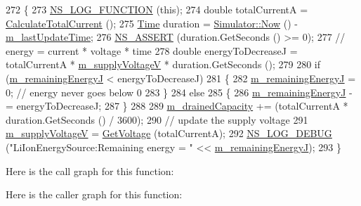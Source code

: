 \begin{DoxyCode}
272 \{
273   \hyperlink{log-macros-disabled_8h_a90b90d5bad1f39cb1b64923ea94c0761}{NS\_LOG\_FUNCTION} (\textcolor{keyword}{this});
274   \textcolor{keywordtype}{double} totalCurrentA = \hyperlink{classns3_1_1EnergySource_ac8b121ba1389d5545705e52d1a6fd602}{CalculateTotalCurrent} ();
275   \hyperlink{namespacens3_1_1TracedValueCallback_a7ffd3e7c142ffe7c8a1d2db9b8de38ec}{Time} duration = \hyperlink{classns3_1_1Simulator_ac3178fa975b419f7875e7105be122800}{Simulator::Now} () - \hyperlink{classns3_1_1LiIonEnergySource_aff305a21b56ec669a64b5e0fa5d8d268}{m\_lastUpdateTime};
276   \hyperlink{assert_8h_a6dccdb0de9b252f60088ce281c49d052}{NS\_ASSERT} (duration.GetSeconds () >= 0);
277   \textcolor{comment}{// energy = current * voltage * time}
278   \textcolor{keywordtype}{double} energyToDecreaseJ = totalCurrentA * \hyperlink{classns3_1_1LiIonEnergySource_a52a95a68d5ee4c420a207d00c2905eb2}{m\_supplyVoltageV} * duration.GetSeconds ();
279 
280   \textcolor{keywordflow}{if} (\hyperlink{classns3_1_1LiIonEnergySource_a550b7c1858cc4a397290c5696eff4e3e}{m\_remainingEnergyJ} < energyToDecreaseJ) 
281     \{
282       \hyperlink{classns3_1_1LiIonEnergySource_a550b7c1858cc4a397290c5696eff4e3e}{m\_remainingEnergyJ} = 0; \textcolor{comment}{// energy never goes below 0}
283     \} 
284   \textcolor{keywordflow}{else} 
285     \{
286       \hyperlink{classns3_1_1LiIonEnergySource_a550b7c1858cc4a397290c5696eff4e3e}{m\_remainingEnergyJ} -= energyToDecreaseJ;
287     \}  
288 
289   \hyperlink{classns3_1_1LiIonEnergySource_a185b1e4fc53512a50a8d3c4400877f2c}{m\_drainedCapacity} += (totalCurrentA * duration.GetSeconds () / 3600);
290   \textcolor{comment}{// update the supply voltage}
291   \hyperlink{classns3_1_1LiIonEnergySource_a52a95a68d5ee4c420a207d00c2905eb2}{m\_supplyVoltageV} = \hyperlink{classns3_1_1LiIonEnergySource_ab27fe1a4814c0c1a4d67936c6c2b141f}{GetVoltage} (totalCurrentA);
292   \hyperlink{group__logging_ga413f1886406d49f59a6a0a89b77b4d0a}{NS\_LOG\_DEBUG} (\textcolor{stringliteral}{"LiIonEnergySource:Remaining energy = "} << 
      \hyperlink{classns3_1_1LiIonEnergySource_a550b7c1858cc4a397290c5696eff4e3e}{m\_remainingEnergyJ});
293 \}
\end{DoxyCode}


Here is the call graph for this function\+:




Here is the caller graph for this function\+:


